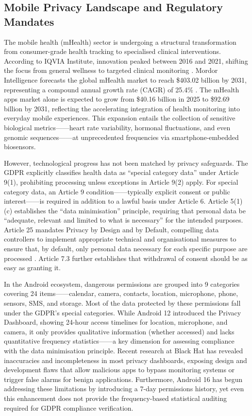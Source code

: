 \subsection{Mobile Privacy Landscape and Regulatory Mandates}

The mobile health (mHealth) sector is undergoing a structural transformation from consumer-grade health tracking to specialised clinical interventions. According to IQVIA Institute, innovation peaked between 2016 and 2021, shifting the focus from general wellness to targeted clinical monitoring \cite{iqvia2021}. Mordor Intelligence forecasts the global mHealth market to reach \$403.02 billion by 2031, representing a compound annual growth rate (CAGR) of 25.4\% \cite{mordor2023}. The mHealth apps market alone is expected to grow from \$40.16 billion in 2025 to \$92.69 billion by 2031, reflecting the accelerating integration of health monitoring into everyday mobile experiences. This expansion entails the collection of sensitive biological metrics——heart rate variability, hormonal fluctuations, and even genomic sequences——at unprecedented frequencies via smartphone-embedded biosensors.

However, technological progress has not been matched by privacy safeguards. The GDPR explicitly classifies health data as ``special category data'' under Article 9(1), prohibiting processing unless exceptions in Article 9(2) apply. For special category data, an Article 9 condition——typically explicit consent or public interest——is required in addition to a lawful basis under Article 6. Article 5(1)(c) establishes the ``data minimisation'' principle, requiring that personal data be ``adequate, relevant and limited to what is necessary'' for the intended purposes. Article 25 mandates Privacy by Design and by Default, compelling data controllers to implement appropriate technical and organisational measures to ensure that, by default, only personal data necessary for each specific purpose are processed \cite{eurlex2016}. Article 7.3 further establishes that withdrawal of consent should be as easy as granting it.

In the Android ecosystem, dangerous permissions are grouped into 9 categories covering 24 items——calendar, camera, contacts, location, microphone, phone, sensors, SMS, and storage. Most of the data protected by these permissions fall under the GDPR's special categories. While Android 12 introduced the Privacy Dashboard, showing 24-hour access timelines for location, microphone, and camera, it only provides qualitative information (whether accessed) and lacks quantitative frequency statistics——a key dimension for assessing compliance with the data minimisation principle. Recent research at Black Hat has revealed inaccuracies and incompleteness in most privacy dashboards, exposing design and development flaws that allow malicious apps to bypass monitoring systems or trigger false alarms for benign applications. Furthermore, Android 16 has begun addressing these limitations by introducing a 7-day permissions history, yet even this enhancement does not provide the frequency-based statistical auditing required for GDPR compliance verification.

